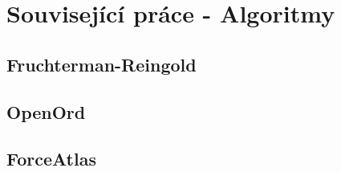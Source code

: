 \chapter{Související práce - Algoritmy}

\section{Fruchterman-Reingold}

\section{OpenOrd}

\section{ForceAtlas}
